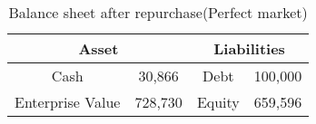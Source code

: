 \begin{table}[ht]
\centering
\begin{tabular}{@{}cccc@{}}
\toprule
\multicolumn{2}{c}{Asset}  & \multicolumn{2}{c}{Liabilities} \\ \midrule
Cash             & 30,866 & Debt           & 100,000              \\
Enterprise Value & 728,730 & Equity         & 659,596        \\ \bottomrule
\end{tabular}
\caption{Balance sheet after repurchase(Perfect market)}
\label{tab:bs_after_repurchase_perfect}
\end{table}
